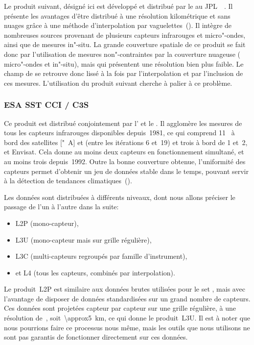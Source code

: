 Le produit suivant, désigné ici  est développé et distribué par le  au JPL~~.
Il présente les avantages d'être distribué à une résolution kilométrique et sans nuages grâce à une méthode d'interpolation par vaguelettes~(\cite{chin_2017}).
Il intègre de nombreuses sources provenant de plusieurs capteurs infrarouges et micro"-ondes, ainsi que de mesures in"-situ.
La grande couverture spatiale de ce produit se fait donc par l'utilisation de mesures non"-contraintes par la couverture nuageuse ( micro"-ondes et in"-situ), mais qui présentent une résolution bien plus faible.
Le champ de  se retrouve donc lissé à la fois par l'interpolation et par l'inclusion de ces mesures.
L'utilisation du produit suivant cherche à palier à ce problème.

\subsubsection{ESA SST CCI / C3S}

Ce produit est distribué conjointement par l'   et le .
Il agglomère les mesures de tous les capteurs infrarouges disponibles depuis~1981, ce qui comprend 11~ à bord des satellites ["~A] et  (entre les itérations 6 et~19) et trois  à bord de  1 et~2, et Envisat.
Cela donne au moins deux capteurs en fonctionnement simultané, et au moins trois depuis~1992.
Outre la bonne couverture obtenue, l'uniformité des capteurs permet d'obtenir un jeu de données stable dans le temps, pouvant servir à la détection de tendances climatiques~(\cite{merchant_2019}).

Les données sont distribuées à différents niveaux, dont nous allons préciser le passage de l'un à l'autre dans la suite:
\begin{itemize}
  \item L2P (mono-capteur),
  \item L3U (mono-capteur mais sur grille régulière),
  \item L3C (multi-capteurs regroupés par famille d'instrument),
  \item et L4 (tous les capteurs, combinés par interpolation).
\end{itemize}

Le produit~L2P est similaire aux données brutes utilisées pour le set , mais avec l'avantage de disposer de données standardisées sur un grand nombre de capteurs.
Ces données sont projetées capteur par capteur sur une grille régulière, à une résolution de~, soit~\qty{\approx5}{\km}, ce qui donne le produit~L3U.
Il est à noter que nous pourrions faire ce processus nous même, mais les outils que nous utilisons ne sont pas garantis de fonctionner directement sur ces données.


